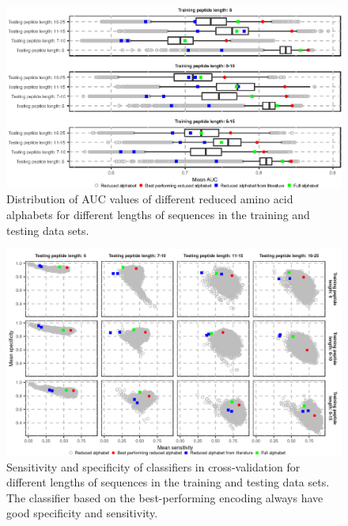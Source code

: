 \documentclass{bioinfo}
\begin{document}
\begin{figure}[!tpb]
\centerline{\includegraphics{figures/AUC_boxplot.eps}}
\caption{Distribution of AUC values of different reduced amino acid alphabets 
for different lengths of sequences in the training and testing data sets.
}\label{fig:AUC_boxplot} 
\end{figure}


\begin{figure}[!tpb]
\centerline{\includegraphics{figures/sesp_plot.png}}
\caption{Sensitivity and specificity of classifiers in cross-validation for 
different lengths of sequences in the training and testing data sets.
The classifier based on the best-performing encoding always have 
good specificity and sensitivity.}\label{fig:sesp_plot}
\end{figure}
\end{document}
